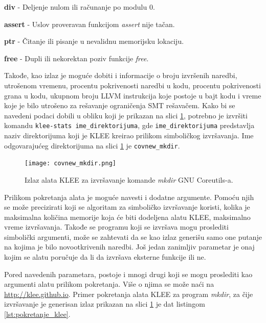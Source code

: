 \documentclass[12pt,oneside]{memoir}
\begin{document}
\begin{description}
    \item \textbf{div} - Deljenje nulom ili računanje po modulu 0.
    
    \item \textbf{assert} - Uslov proveravan funkcijom \textit{assert} nije tačan.
    
    \item \textbf{ptr} - Čitanje ili pisanje u nevalidnu memorijsku lokaciju.
    
    \item \textbf{free} - Dupli ili nekorektan poziv funkcije \textit{free}.
\end{description}

Takođe, kao izlaz je moguće dobiti i informacije o broju izvršenih naredbi, utrošenom vremenu, procentu pokrivenosti naredbi u kodu, procentu pokrivenosti grana u kodu, ukupnom broju LLVM instrukcija koje postoje u bajt kodu i vreme koje je bilo utrošeno za rešavanje ograničenja SMT rešavačem. Kako bi se navedeni podaci dobili u obliku koji je prikazan na slici \ref{fig:covnew_mkdir}, potrebno je izvršiti komandu \texttt{klee-stats ime\_direktorijuma}, gde \texttt{ime\_direktorijuma} predstavlja naziv direktorijuma koji je KLEE kreirao prilikom simboličkog izvršavanja. Ime odgovarajućeg direktorijuma na slici \ref{fig:covnew_mkdir} je \texttt{covnew\_mkdir}.

\begin{figure}[ht]
    \centering
    \texttt{[image: covnew\_mkdir.png]}
    \caption{Izlaz alata KLEE za izvršavanje komande \textit{mkdir} GNU Coreutils-a.}
    \label{fig:covnew_mkdir}
\end{figure}

Prilikom pokretanja alata je moguće navesti i dodatne argumente. Pomoću njih se može precizirati koji se algoritam za simboličko izvršavanje koristi, kolika je maksimalna količina memorije koja će biti dodeljena alatu KLEE, maksimalno vreme izvršavanja. Takođe se programu koji se izvršava mogu proslediti simbolički argumenti, može se zahtevati da se kao izlaz generišu samo one putanje na kojima je bilo novootkrivenih naredbi. Još jedan zanimljiv parametar je onaj kojim se alatu poručuje da li da izvršava eksterne funkcije ili ne. 

Pored navedenih parametara, postoje i mnogi drugi koji se mogu proslediti kao argumenti alatu prilikom pokretanja. Više o njima se može naći na \url{http://klee.github.io}. Primer pokretanja alata KLEE za program \textit{mkdir}, za čije izvršavanje je generisan izlaz prikazan na slici \ref{fig:covnew_mkdir} je dat listingom \ref{lst:pokretanje_klee}.
\end{document}
